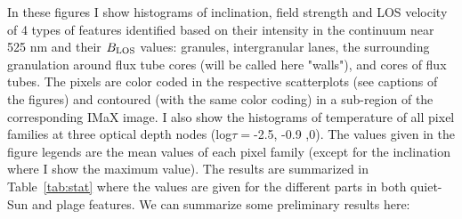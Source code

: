 \documentclass[goettingen, gauss, print]{thesis}
\begin{document}
In these figures I show histograms of inclination, field strength and LOS velocity of 4 types of features identified based on their intensity in the continuum near 525 nm and their $B_{\rm LOS}$ values: granules, intergranular lanes, the surrounding granulation around flux tube cores (will be called here "walls"), and cores of flux tubes. The pixels are color coded in the respective scatterplots (see captions of the figures) and contoured (with the same color coding) in a sub-region of the corresponding IMaX image. I also show the histograms of temperature of all pixel families at three optical depth nodes (log$\tau=$-2.5, -0.9 ,0).
The values given in the figure legends are the mean values of each pixel family (except for the inclination where I show the maximum value). The results are summarized in Table~\ref{tab:stat} where the values are given for the different parts in both quiet-Sun and plage features. We can summarize some preliminary results here:
\end{document}
